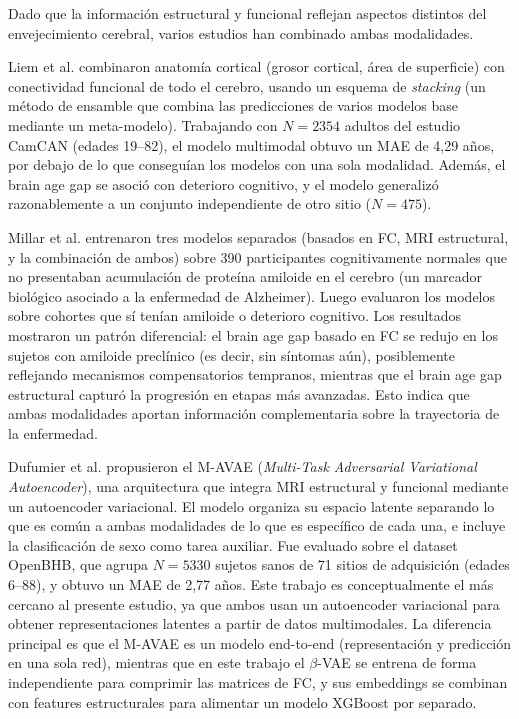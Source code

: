 Dado que la información estructural y funcional reflejan aspectos distintos del envejecimiento cerebral, varios estudios han combinado ambas modalidades.

Liem et al. \cite{liem2017predicting} combinaron anatomía cortical (grosor cortical, área de superficie) con conectividad funcional de todo el cerebro, usando un esquema de \textit{stacking} (un método de ensamble que combina las predicciones de varios modelos base mediante un meta-modelo). Trabajando con $N = 2354$ adultos del estudio CamCAN (edades 19--82), el modelo multimodal obtuvo un MAE de 4,29 años, por debajo de lo que conseguían los modelos con una sola modalidad. Además, el brain age gap se asoció con deterioro cognitivo, y el modelo generalizó razonablemente a un conjunto independiente de otro sitio ($N = 475$).

Millar et al. \cite{millar2023multimodal} entrenaron tres modelos separados (basados en FC, MRI estructural, y la combinación de ambos) sobre 390 participantes cognitivamente normales que no presentaban acumulación de proteína amiloide en el cerebro (un marcador biológico asociado a la enfermedad de Alzheimer). Luego evaluaron los modelos sobre cohortes que sí tenían amiloide o deterioro cognitivo. Los resultados mostraron un patrón diferencial: el brain age gap basado en FC se redujo en los sujetos con amiloide preclínico (es decir, sin síntomas aún), posiblemente reflejando mecanismos compensatorios tempranos, mientras que el brain age gap estructural capturó la progresión en etapas más avanzadas. Esto indica que ambas modalidades aportan información complementaria sobre la trayectoria de la enfermedad.

Dufumier et al. \cite{dufumier2024multi} propusieron el M-AVAE (\textit{Multi-Task Adversarial Variational Autoencoder}), una arquitectura que integra MRI estructural y funcional mediante un autoencoder variacional. El modelo organiza su espacio latente separando lo que es común a ambas modalidades de lo que es específico de cada una, e incluye la clasificación de sexo como tarea auxiliar. Fue evaluado sobre el dataset OpenBHB, que agrupa $N = 5330$ sujetos sanos de 71 sitios de adquisición (edades 6--88), y obtuvo un MAE de 2,77 años. Este trabajo es conceptualmente el más cercano al presente estudio, ya que ambos usan un autoencoder variacional para obtener representaciones latentes a partir de datos multimodales. La diferencia principal es que el M-AVAE es un modelo end-to-end (representación y predicción en una sola red), mientras que en este trabajo el $\beta$-VAE se entrena de forma independiente para comprimir las matrices de FC, y sus embeddings se combinan con features estructurales para alimentar un modelo XGBoost por separado.

